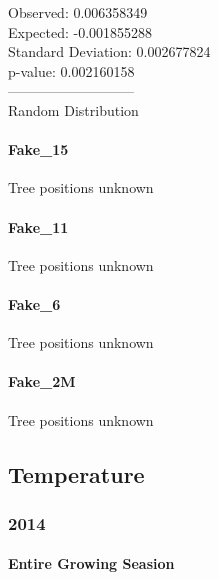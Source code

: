 \documentclass[
]{article}
\begin{document}
Observed: 0.006358349\\
Expected: -0.001855288\\
Standard Deviation: 0.002677824\\
p-value: 0.002160158\\
---------------------------\\
Random Distribution

\hypertarget{fake_15}{%
\paragraph{Fake\_15}\label{fake_15}}

Tree positions unknown

\hypertarget{fake_11}{%
\paragraph{Fake\_11}\label{fake_11}}

Tree positions unknown

\hypertarget{fake_6}{%
\paragraph{Fake\_6}\label{fake_6}}

Tree positions unknown

\hypertarget{fake_2m}{%
\paragraph{Fake\_2M}\label{fake_2m}}

Tree positions unknown

\hypertarget{temperature-1}{%
\subsection{Temperature}\label{temperature-1}}

\hypertarget{section-18}{%
\subsubsection{2014}\label{section-18}}

\hypertarget{entire-growing-seasion}{%
\paragraph{Entire Growing Seasion}\label{entire-growing-seasion}}
\end{document}
